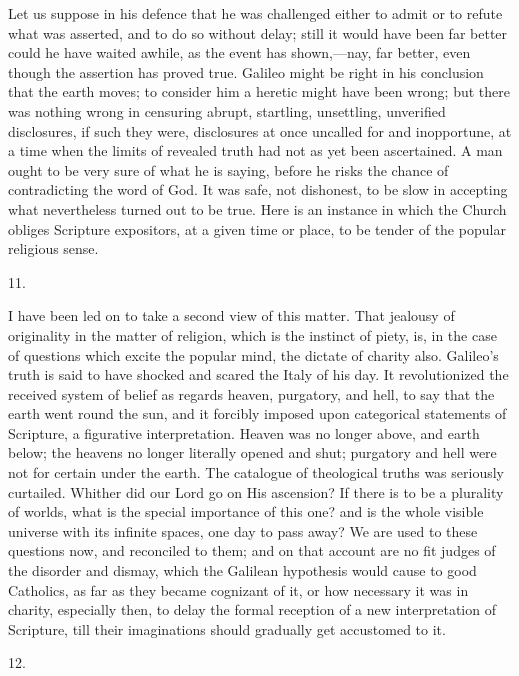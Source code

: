 Let us suppose in his defence that he was challenged either to
admit or to refute what was asserted, and to do so without delay;
still it would have been far better could he have waited awhile, as
the event has shown,—nay, far better, even though the assertion has
proved true. Galileo might be right in his conclusion that the
earth moves; to consider him a heretic might have been wrong; but
there was nothing wrong in censuring abrupt, startling, unsettling,
unverified disclosures, if such they were, disclosures at once
uncalled for and inopportune, at a time when the limits of revealed
truth had not as yet been ascertained. A man ought to be very sure of
what he is saying, before he risks the chance of contradicting the
word of God. It was safe, not dishonest, to be slow in accepting what
nevertheless turned out to be true. Here is an instance in which the
Church obliges Scripture expositors, at a given time or place, to be
tender of the popular religious sense.

11.

I have been led on to take a second view of this matter. That
jealousy of originality in the matter of religion, which is the
instinct of piety, is, in the case of questions which excite the
popular mind, the dictate of charity also. Galileo's truth is said to
have shocked and scared the Italy of his day. It revolutionized the
received system of belief as regards heaven, purgatory, and hell, to
say that the earth went round the sun, and it forcibly imposed upon
categorical statements of Scripture, a figurative interpretation.
Heaven was no longer above, and earth below; the heavens no longer
literally opened and shut; purgatory and hell were not for
certain under the earth. The catalogue of theological truths was
seriously curtailed. Whither did our Lord go on His ascension? If
there is to be a plurality of worlds, what is the special importance
of this one? and is the whole visible universe with its infinite
spaces, one day to pass away? We are used to these questions now, and
reconciled to them; and on that account are no fit judges of the
disorder and dismay, which the Galilean hypothesis would cause to good
Catholics, as far as they became cognizant of it, or how necessary it
was in charity, especially then, to delay the formal reception of a
new interpretation of Scripture, till their imaginations should
gradually get accustomed to it.

12.

